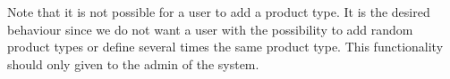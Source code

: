 Note that it is not possible for a user to add a product type. It is the desired behaviour since we do not want a user with the possibility to add random product types or define several times the same product type. This functionality should only given to the admin of the system.
%
%
%
%
%
%
%
%
%
%
%
